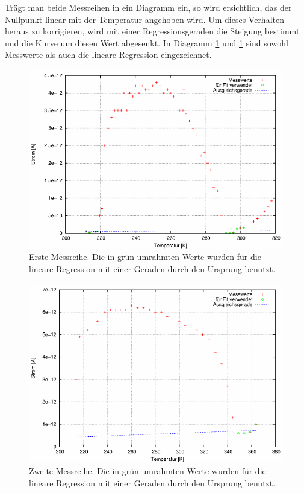 Trägt man beide Messreihen in ein Diagramm ein, so wird ersichtlich, das der Nullpunkt linear mit der Temperatur angehoben wird. Um dieses Verhalten heraus zu korrigieren, wird mit einer Regressionsgeraden die Steigung bestimmt und die Kurve um diesen Wert abgesenkt. In Diagramm \ref{pic_dia1} und \ref{pic_dia1} sind sowohl Messwerte als auch die lineare Regression eingezeichnet.

\begin{figure}[htbp]
\includegraphics[scale=0.8]{../gnu/relax11.pdf}
\caption{Erste Messreihe. Die in grün umrahmten Werte wurden für die lineare Regression mit einer Geraden durch den Ursprung benutzt.}
\label{pic_dia1}
\end{figure}
\begin{figure}[htbp]
\includegraphics[scale=0.8]{../gnu/relax12.pdf}
\caption{Zweite Messreihe. Die in grün umrahmten Werte wurden für die lineare Regression mit einer Geraden durch den Ursprung benutzt.}
\label{pic_dia2}
\end{figure}

